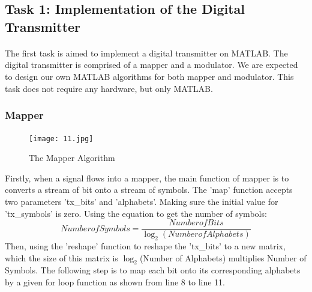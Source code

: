 \documentclass[12pt]{article}
\begin{document}
    
    
    
    
    
    
    
    
    
    
    
    
    
    
    
    
    
    
    
    
    
    
    \subsection{Task 1: Implementation of the Digital Transmitter}
    \paragraph{}
    The first task is aimed to implement a digital transmitter on MATLAB. The digital transmitter is comprised of a mapper and a modulator. We are expected to design our own MATLAB algorithms for both mapper and modulator. This task does not require any hardware, but only MATLAB. 
    \subsubsection{Mapper}
    \paragraph{}
    \begin{figure}[H]
    \centering
    \texttt{[image: 11.jpg]}
    \caption{The Mapper Algorithm}
    \end{figure}
    Firstly, when a signal flows into a mapper, the main function of mapper is to converts a stream of bit onto a stream of symbols. The 'map' function accepts two parameters 'tx\_bits' and 'alphabets'. Making sure the initial value for 'tx\_symbols' is zero. Using the equation to get the number of symbols:
    \begin{equation}
        Number of Symbols=\frac{Number of Bits}{\log_2(Number of Alphabets)}
    \end{equation}
    Then, using the 'reshape' function to reshape the 'tx\_bits' to a new matrix, which the size of this matrix is $\log_2$(Number of Alphabets) multiplies Number of Symbols. The following step is to map each bit onto its corresponding alphabets by a given for loop function as shown from line 8 to line 11.
\end{document}
